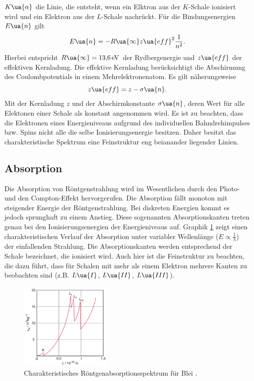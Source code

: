 $K\ua{\alpha}$ die Linie, die entsteht, wenn ein Elktron aus der $K$-Schale ionisiert wird und ein Elektron aus der $L$-Schale
nachrückt. Für die Bindungsenergien $E\ua{n}$ gilt
\begin{equation}
  E\ua{n} = -R\ua{\infty} z\ua{eff}^2 \frac{1}{n^2}.
  \label{eq: E_niveaus}
\end{equation}
Hierbei entspricht $R\ua{\infty} = \SI{13.6}{\eV}$ der Rydbergenergie und $z\ua{eff}$ der effektiven Kernladung. Die effektive
Kernladung berücksichtigt die Abschirmung des Coulombpotentials in einem Mehrelektronenatom. Es gilt näherungsweise
\begin{equation}
  z\ua{eff} = z - \sigma\ua{n}.
  \label{eq: abschirmkonstante}
\end{equation}
Mit der Kernladung $z$ und der Abschirmkonstante $\sigma\ua{n}$, deren Wert für alle Elektonen einer Schale als konstant angenommen wird.
Es ist zu beachten, dass die Elektronen eines Energieniveaus
aufgrund des individuellen Bahndrehimpulses bzw. Spins nicht alle die selbe Ionisierungsenergie besitzen. Daher besitzt das charakteristische
Spektrum eine Feinstruktur eng beianander liegender Linien.

\subsection{Absorption}
Die Absorption von Röntgenstrahlung wird im Wesentlichen durch den Photo- und den Compton-Effekt hervorgerufen. Die Absorption
fällt monoton mit steigender Energie der Röntgenstrahlung. Bei diskreten Energien kommt es jedoch sprunghaft zu einem Anstieg. Diese
sogenannten Absorptionskanten treten genau bei den Ionisierungsenergien der Energieniveaus auf. Graphik \ref{fig: absorption} zeigt einen charakteristischen
Verlauf der Absorption unter variabler Wellenlänge ($E \propto \frac{1}{\lambda}$) der einfallenden Strahlung.
Die Absorptionskanten werden entsprechend der Schale bezeichnet, die ionisiert wird.
Auch hier ist die Feinstruktur zu beachten, die dazu
führt, dass für Schalen mit mehr als einem Elektron mehrere Kanten zu beobachten sind (z.B. $L\ua{I}$, $L\ua{II}$, $L\ua{III}$).
\begin{figure}[H]
  \centering
  \includegraphics[width = 0.4\textwidth]{pics/absorption.png}
  \caption{Charakteristisches Röntgenabsorptionsspektrum für Blei \cite{dem}.}
  \label{fig: absorption}
\end{figure}

